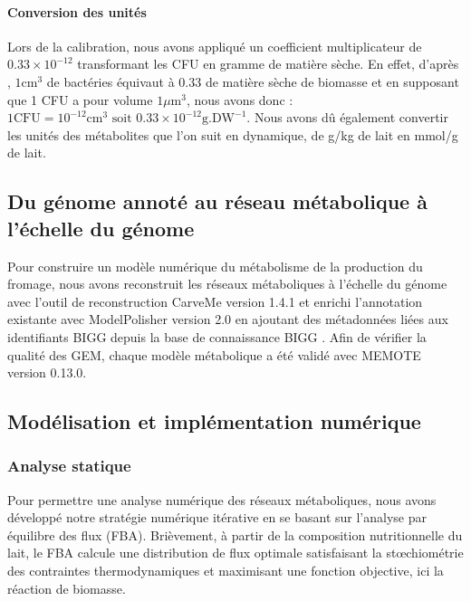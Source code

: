 \paragraph*{Conversion des unités}
Lors de la calibration, nous avons appliqué un coefficient multiplicateur de $0.33\times10^{-12}$ transformant les CFU en gramme de matière sèche. En effet, d'après \citep{Bakken1983}, $1\text{cm}^3$ de bactéries équivaut à 0.33 de matière sèche de biomasse et en supposant que 1 CFU a pour volume $1 \mu\text{m}^3$, nous avons donc : $1 \text{CFU} = 10^{-12} \text{cm}^3 \text{ soit } 0.33 \times10^{-12} \text{g.DW}^{-1}$. Nous avons dû également convertir les unités des métabolites que l'on suit en dynamique, de g/kg de lait en mmol/g de lait.



\subsection{Du génome annoté au réseau métabolique à l'échelle du génome}
Pour construire un modèle numérique du métabolisme de la production du fromage, nous avons reconstruit les réseaux métaboliques à l'échelle du génome avec l'outil de reconstruction CarveMe \citep{Machado2018} version 1.4.1 et enrichi l'annotation existante avec ModelPolisher \citep{Romer2016} version 2.0 en ajoutant des métadonnées liées aux identifiants BIGG depuis la base de connaissance BIGG \citep{King2016}. Afin de vérifier la qualité des GEM, chaque modèle métabolique a été validé avec MEMOTE \citep{Lieven.2020} version 0.13.0.

\subsection{Modélisation et implémentation numérique}

\subsubsection*{Analyse statique}
Pour permettre une analyse numérique des réseaux métaboliques, nous avons développé notre stratégie numérique itérative en se basant sur l'analyse par équilibre des flux (FBA)\citep{Orth2010}. Brièvement, à partir de la composition nutritionnelle du lait, le FBA calcule une distribution de flux optimale satisfaisant la st\oe{}chiométrie des contraintes thermodynamiques et maximisant une fonction objective, ici la réaction de biomasse.

